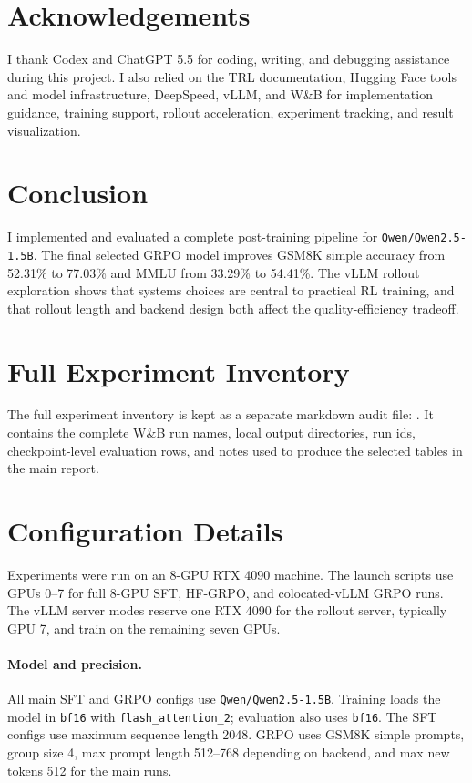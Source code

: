 \documentclass[11pt]{article}
\begin{document}
\section{Acknowledgements}
I thank Codex and ChatGPT 5.5 for coding, writing, and debugging assistance during this project. I also relied on the TRL documentation, Hugging Face tools and model infrastructure, DeepSpeed, vLLM, and W\&B for implementation guidance, training support, rollout acceleration, experiment tracking, and result visualization.

\section{Conclusion}
I implemented and evaluated a complete post-training pipeline for \texttt{Qwen/Qwen2.5-1.5B}. The final selected GRPO model improves GSM8K simple accuracy from 52.31\% to 77.03\% and MMLU from 33.29\% to 54.41\%. The vLLM rollout exploration shows that systems choices are central to practical RL training, and that rollout length and backend design both affect the quality-efficiency tradeoff.

\nocite{rajbhandari2020zeromemoryoptimizationstraining,vonwerra2020trl,shao2024deepseekmathpushinglimitsmathematical,kwon2023efficient,liu2025understandingr1zeroliketrainingcritical,qwen2025qwen25technicalreport}



\appendix
\section{Full Experiment Inventory}
\label{app:inventory}
The full experiment inventory is kept as a separate markdown audit file: . It contains the complete W\&B run names, local output directories, run ids, checkpoint-level evaluation rows, and notes used to produce the selected tables in the main report.

\section{Configuration Details}
\label{app:configs}
Experiments were run on an 8-GPU RTX 4090 machine. The launch scripts use GPUs 0--7 for full 8-GPU SFT, HF-GRPO, and colocated-vLLM GRPO runs. The vLLM server modes reserve one RTX 4090 for the rollout server, typically GPU 7, and train on the remaining seven GPUs.

\paragraph{Model and precision.}
All main SFT and GRPO configs use \texttt{Qwen/Qwen2.5-1.5B}. Training loads the model in \texttt{bf16} with \texttt{flash\_attention\_2}; evaluation also uses \texttt{bf16}. The SFT configs use maximum sequence length 2048. GRPO uses GSM8K simple prompts, group size 4, max prompt length 512--768 depending on backend, and max new tokens 512 for the main runs.
\end{document}
